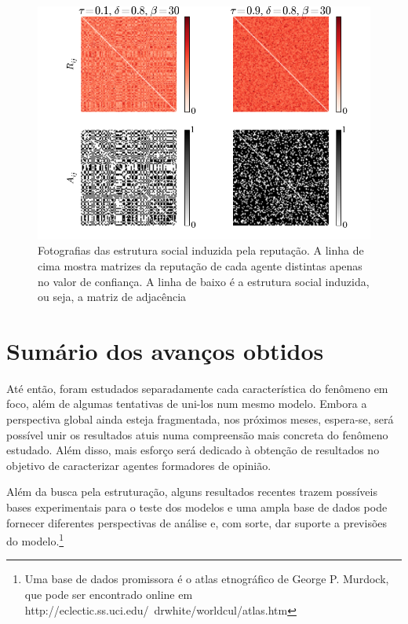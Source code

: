 \documentclass[11pt]{article}
\begin{document}
\begin{figure}[h!]
  \centering
      \includegraphics[width=1.0\textwidth]{data2.png}
  \caption{Fotografias das estrutura social induzida pela reputação. A linha de
  cima mostra matrizes da reputação de cada agente distintas apenas no valor de
  confiança. A linha de baixo é a estrutura social induzida, ou seja, a matriz
  de adjacência}
  \label{data2}
\end{figure}

\section{Sumário dos avanços obtidos}

Até então, foram estudados separadamente cada característica do fenômeno em foco,
além de algumas tentativas de uni-los num mesmo modelo. Embora a perspectiva
global ainda esteja fragmentada, nos próximos meses, espera-se, será possível
unir os resultados atuis numa compreensão mais concreta do fenômeno estudado.
Além disso, mais esforço será dedicado à obtenção de resultados no objetivo de
caracterizar agentes formadores de opinião.

Além da busca pela estruturação, alguns resultados recentes trazem possíveis
bases experimentais para o teste dos modelos \cite{Toorn} e
uma ampla base de dados pode fornecer diferentes perspectivas de
análise e, com sorte, dar suporte a previsões do modelo.\footnote{Uma base de
dados promissora é o atlas etnográfico de George P. Murdock, que pode ser
encontrado online em http://eclectic.ss.uci.edu/~drwhite/worldcul/atlas.htm}
\end{document}
